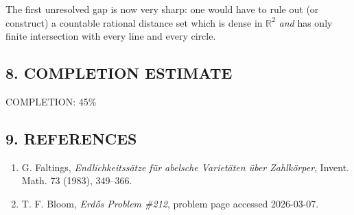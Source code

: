 The first unresolved gap is now very sharp: one would have to rule out (or construct) a countable rational distance set which is dense in $\mathbb{R}^2$ \emph{and} has only finite intersection with every line and every circle.

\subsection*{8. COMPLETION ESTIMATE}
COMPLETION: 45\%

\subsection*{9. REFERENCES}
\begin{enumerate}
\item G. Faltings, \emph{Endlichkeitss\"atze f\"ur abelsche Variet\"aten \"uber Zahlk\"orper}, Invent. Math. 73 (1983), 349--366.
\item T. F. Bloom, \emph{Erd\H{o}s Problem \#212}, problem page accessed 2026-03-07.
\end{enumerate}


